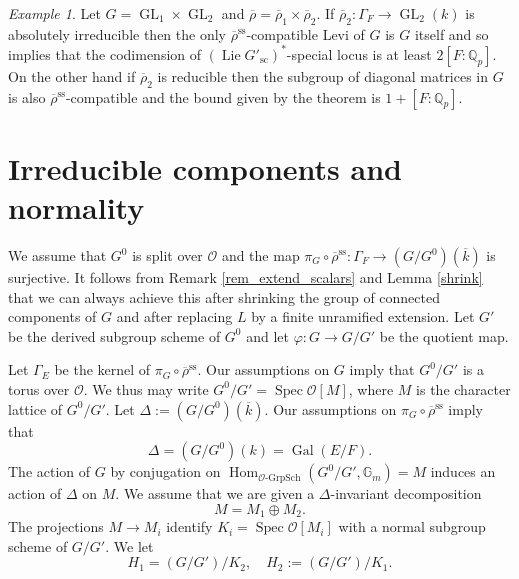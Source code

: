 \documentclass{amsart}
\theoremstyle{definition}
\theoremstyle{remark}
\newtheorem{examp}[prop]{Example}
\DeclareMathOperator{\Hom}{Hom}
\DeclareMathOperator{\GL}{GL}
\DeclareMathOperator{\Gal}{Gal}
\DeclareMathOperator{\Spec}{Spec}
\newcommand{\Qp}{\mathbb {Q}_p}
\newcommand{\OO}{\mathcal O}
\newcommand{\rhobar}{\overline{\rho}}
\newcommand{\Gm}{\mathbb G_{m}}
\DeclareMathOperator{\Lie}{Lie}
\newcommand{\kbar}{\overline{k}}
\newcommand{\rhobarss}{\rhobar^{\mathrm{ss}}}
\newcommand{\hyphen}{\text{-}}
\newcommand{\sic}{\operatorname{sc}}
\begin{document}
\begin{examp} Let $G=\GL_1\times \GL_2$ and $\rhobar= \rhobar_1\times \rhobar_2$. If
$\rhobar_2: \Gamma_F \rightarrow \GL_2(k)$ is absolutely irreducible then the only 
$\rhobarss$-compatible Levi of $G$ is $G$ itself and so  implies that the 
codimension of $(\Lie G'_{\sic})^*$-special locus is at least $2[F:\Qp]$. On the other hand 
if $\rhobar_2$ is reducible then the subgroup of diagonal matrices in $G$ is also 
$\rhobarss$-compatible and the bound given by the theorem is $1+[F:\Qp]$.
\end{examp}

\section{Irreducible components and normality}\label{nightmare_cont}

We assume that
$G^0$ is split over $\OO$ and the map 
$\pi_G\circ \rhobarss: \Gamma_F \rightarrow (G/G^0)(\kbar)$ is surjective. It follows from Remark \ref{rem_extend_scalars} and
Lemma \ref{shrink} that we can always achieve this after shrinking the 
group of connected components of $G$ and after replacing $L$ by a 
finite unramified extension. Let $G'$ be the derived subgroup scheme 
of $G^0$ and let $\varphi: G\rightarrow G/G'$ be the quotient map.

Let $\Gamma_E$ be the kernel of $\pi_G \circ\rhobarss$. 
Our assumptions on $G$ imply that $G^0/G'$ is a torus over $\OO$. 
We thus may write $G^0/G' =\Spec \OO[M]$, where $M$ is the character lattice 
of $G^0/G'$. Let $\Delta:=(G/G^0)(\kbar)$. Our assumptions on 
$\pi_G \circ \rhobarss$ imply that 
$$\Delta= (G/G^0)(k)= \Gal(E/F).$$ 
The action of $G$ by conjugation on $\Hom_{\OO\hyphen\mathrm{GrpSch}}(G^0/G', \Gm)=M$ 
induces an action of $\Delta$ on $M$. We assume that we are given a $\Delta$-invariant decomposition
\begin{equation}\label{decomp_M}
M=M_1 \oplus M_2.
\end{equation}
The projections $M\rightarrow M_i$ identify $K_i=\Spec \OO[M_i]$ with a normal subgroup scheme of $G/G'$. We let 
$$ H_1 = (G/G')/K_2, \quad H_2:= (G/G')/K_1.$$
\end{document}
